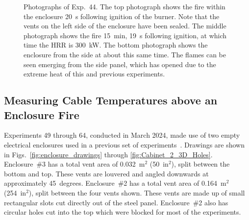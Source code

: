 \begin{figure}[p]
\caption[Photographs of Exp.~44]{Photographs of Exp.~44. The top photograph shows the fire within the enclosure 20~s following ignition of the burner. Note that the vents on the left side of the enclosure have been sealed. The middle photograph shows the fire 15~min, 19~s following ignition, at which time the HRR is 300~kW. The bottom photograph shows the enclosure from the side at about this same time. The flames can be seen emerging from the side panel, which has opened due to the extreme heat of this and previous experiments.}
\label{fig:Test_44_photos}
\end{figure}


\clearpage


\subsection{Measuring Cable Temperatures above an Enclosure Fire}

Experiments 49 through 64, conducted in March 2024, made use of two empty electrical enclosures used in a previous set of experiments~\cite{OLIVE-FIRE}. Drawings are shown in Figs.~\ref{fig:enclosure_drawings} through \ref{fig:Cabinet_2_3D_Holes}. Enclosure~\#3 has a total vent area of 0.032~m$^2$ (50~in$^2$), split between the bottom and top. These vents are louvered and angled downwards at approximately 45~degrees. Enclosure~\#2 has a total vent area of 0.164~m$^2$ (254~in$^2$), split between the four vents shown. These vents are made up of small rectangular slots cut directly out of the steel panel. Enclosure~\#2 also has circular holes cut into the top which were blocked for most of the experiments.


